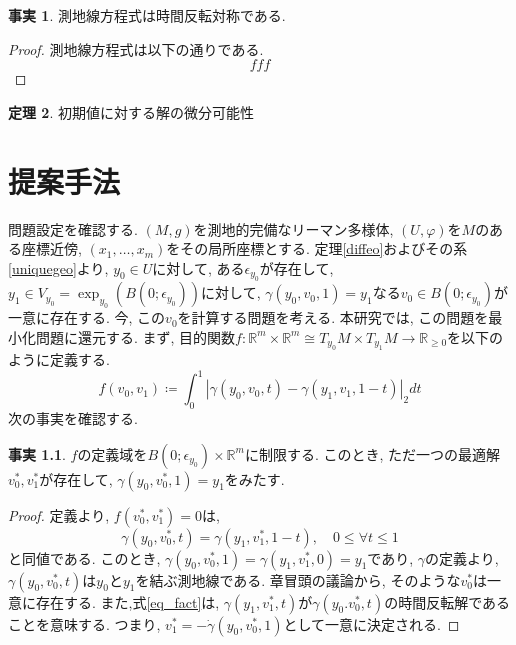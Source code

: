 \documentclass[uplatex]{suribt}
\theoremstyle{definition}
\newtheorem{theorem}{定理}[chapter]
\newtheorem{fact}[theorem]{事実}
\begin{document}
\begin{fact}
測地線方程式は時間反転対称である.
\end{fact}
\begin{proof}
測地線方程式は以下の通りである.
\begin{equation*}
    fff
\end{equation*}
\end{proof}
\begin{theorem}
\label{thm_ode_df}
初期値に対する解の微分可能性
\end{theorem}

\chapter{提案手法}
問題設定を確認する. \((M,g)\)を測地的完備なリーマン多様体, \((U,\varphi)\)を\(M\)のある座標近傍, \((x_1,\ldots,x_m)\)をその局所座標とする. 定理\ref{diffeo}およびその系\ref{uniquegeo}より, \(y_0 \in U\)に対して, ある\(\epsilon_{y_0}\)が存在して, \(y_1 \in V_{y_0} = \exp_{y_0}(B(0;\epsilon_{y_0}))\)に対して, \(\gamma(y_0,v_0,1) = y_1\)なる\(v_0 \in B(0;\epsilon_{y_0})\)が一意に存在する. 今, この\(v_0\)を計算する問題を考える.
\cite{RODRIGUES20161}
本研究では, この問題を最小化問題に還元する. まず, 目的関数\(f:\mathbb{R}^m \times \mathbb{R}^m \cong T_{y_0}M \times T_{y_1}M \to \mathbb{R}_{\geq 0} \)を以下のように定義する.
\begin{equation}
\label{obj}
f(v_0,v_1) \coloneqq \int_{0}^{1}|\gamma(y_0,v_0,t)-\gamma(y_1,v_1,1-t)|_2 dt
\end{equation}
次の事実を確認する.
\begin{fact}
\(f\)の定義域を\(B(0;\epsilon_{y_0}) \times \mathbb{R}^m\)に制限する. このとき, ただ一つの最適解\(v_{0}^{*},v_{1}^{*}\)が存在して, \(\gamma(y_0,v_{0}^{*},1)=y_1\)をみたす.
\end{fact}
\begin{proof}
定義より, \(f(v_{0}^{*},v_{1}^{*})=0\)は, 
\begin{equation}
\label{eq_fact}
    \gamma(y_0,v_{0}^*,t) = \gamma(y_1,v_{1}^*,1-t), \quad 0\le \forall t \le 1
\end{equation}
と同値である. このとき, \(\gamma(y_0,v_{0}^*,1) = \gamma(y_1,v_{1}^*,0) = y_1\)であり, \(\gamma\)の定義より, \(\gamma(y_0,v_{0}^*,t)\)は\(y_0\)と\(y_1\)を結ぶ測地線である. 章冒頭の議論から, そのような\(v_{0}^*\)は一意に存在する. また,式\ref{eq_fact}は, \(\gamma(y_1,v_{1}^*,t)\)が\(\gamma(y_0.v_{0}^*,t)\)の時間反転解であることを意味する. つまり, \(v_{1}^* = -\dot{\gamma}(y_0,v_{0}^*,1)\)として一意に決定される. 
\end{proof}
\end{document}

